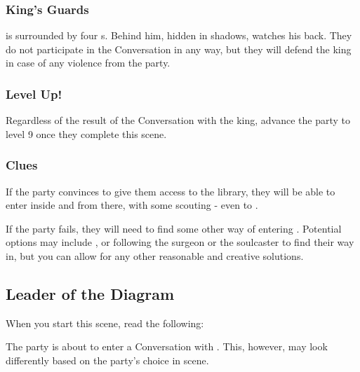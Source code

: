 
\subsubsection{King's Guards}

\enemyTaravangian{} is surrounded by four \enemyDiagramMuscle{}s. Behind him, hidden in shadows, \enemyMalata{} watches his back. They do not participate in the Conversation in any way, but they will defend the king in case of any violence from the party.

\subsubsection{Level Up!}

Regardless of the result of the Conversation with the king, advance the party to level 9 once they complete this scene.

\subsubsection{Clues}

If the party convinces \npcTaravangian{} to give them access to the library, they will be able to enter inside   and from there, with some scouting - even to .

If the party fails, they will need to find some other way of entering . Potential options may include , or following the surgeon or the soulcaster to find their way in, but you can allow for any other reasonable and creative solutions.



\newpage
\subsection{Leader of the Diagram}
\label{ssec:taravangianDiagram}

When you start this scene, read the following:


The party is about to enter a Conversation with \enemyTaravangian{}. This, however, may look differently based on the party's choice in  scene.

